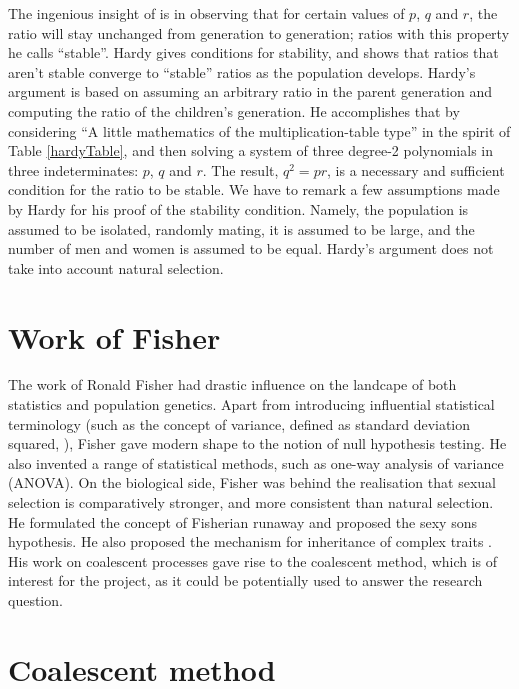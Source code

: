\documentclass{l4proj}
\begin{document}
The ingenious insight of \cite{hardy08} is in observing that for certain values of $p$, $q$ and $r$, the ratio will stay unchanged from generation to generation; ratios with this property he calls ``stable''. Hardy gives conditions for stability, and shows that ratios that aren't stable converge to ``stable'' ratios as the population develops. Hardy's argument is based on assuming an arbitrary ratio in the parent generation and computing the ratio of the children's generation. He accomplishes that by considering ``A little mathematics of the multiplication-table type'' in the spirit of Table \ref{hardyTable}, and then solving a system of three degree-2 polynomials in three indeterminates: $p$, $q$ and $r$. The result, $q^{2}=pr$, is a necessary and sufficient condition for the ratio to be stable. We have to remark a few assumptions made by Hardy for his proof of the stability condition. Namely, the population is assumed to be isolated, randomly mating, it is assumed to be large, and the number of men and women is assumed to be equal. Hardy's argument does not take into account natural selection.

\section{Work of Fisher}

The work of Ronald Fisher had drastic influence on the landcape of both statistics and population genetics. Apart from introducing influential statistical terminology (such as the concept of variance, defined as standard deviation squared, \cite{Fisher18}), Fisher gave modern shape to the notion of null hypothesis testing. He also invented a range of statistical methods, such as one-way analysis of variance (ANOVA). On the biological side, Fisher was behind the realisation that sexual selection is comparatively stronger, and more consistent than natural selection. He formulated the concept of Fisherian runaway and proposed the sexy sons hypothesis. He also proposed the mechanism for inheritance of complex traits \parencite{Fisher18}.  His work on coalescent processes gave rise to the coalescent method, which is of interest for the project, as it could be potentially used to answer the research question.

\section{Coalescent method}
\end{document}
